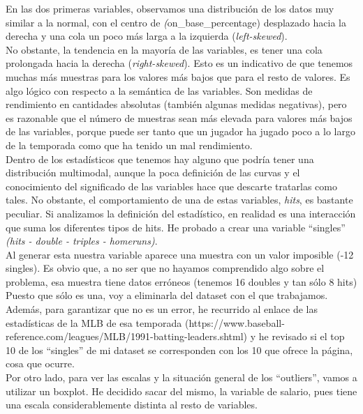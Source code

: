 \documentclass[a4paper,12pt, oneside]{book}
\begin{document}
En las dos primeras variables, observamos una distribución de los datos muy similar a la normal, con el centro de \textit(on\_base\_percentage) desplazado hacia la derecha y una cola un poco más larga a la izquierda (\textit{left-skewed}). \\

No obstante, la tendencia en la mayoría de las variables, es tener una cola prolongada hacia la derecha (\textit{right-skewed}). Esto es un indicativo de que tenemos muchas más muestras para los valores más bajos que para el resto de valores. Es algo lógico con respecto a la semántica de las variables. Son medidas de rendimiento en cantidades absolutas (también algunas medidas negativas), pero es razonable que el número de muestras sean más elevada para valores más bajos de las variables, porque puede ser tanto que un jugador ha jugado poco a lo largo de la temporada como que ha tenido un mal rendimiento. \\

Dentro de los estadísticos que tenemos hay alguno que podría tener una distribución multimodal, aunque la poca definición de las curvas y el conocimiento del significado de las variables hace que descarte tratarlas como tales. No obstante, el comportamiento de una de estas variables, \textit{hits}, es bastante peculiar. Si analizamos la definición del estadístico, en realidad es una interacción que suma los diferentes tipos de hits. He probado a crear una variable ``singles'' \textit{(hits - double - triples - homeruns)}.\\

Al generar esta nuestra variable aparece una muestra con un valor imposible (-12 singles). Es obvio que, a no ser que no hayamos comprendido algo sobre el problema, esa muestra tiene datos erróneos (tenemos 16 doubles y tan sólo 8 hits) Puesto que sólo es una, voy a eliminarla del dataset con el que trabajamos. Además, para garantizar que no es un error, he recurrido al enlace de las estadísticas de la MLB de esa temporada (https://www.baseball-reference.com/leagues/MLB/1991-batting-leaders.shtml) y he revisado si el top 10 de los ``singles'' de mi dataset se corresponden con los 10 que ofrece la página, cosa que ocurre. \\
	
Por otro lado, para ver las escalas y la situación general de los ``outliers'', vamos a utilizar un boxplot. He decidido sacar del mismo, la variable de salario, pues tiene una escala considerablemente distinta al resto de variables. \\
\end{document}
